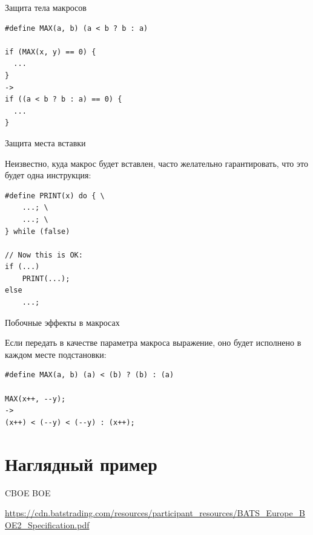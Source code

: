 \documentclass[unknownkeysallowed,xcolor=table]{beamer}
\begin{document}
\begin{frame}[fragile]{Защита тела макросов}

\begin{lstlisting}
#define MAX(a, b) (a < b ? b : a)

if (MAX(x, y) == 0) {
  ...
}
->
if ((a < b ? b : a) == 0) {
  ...
}
\end{lstlisting}

\end{frame}

\begin{frame}[fragile]{Защита места вставки}

Неизвестно, куда макрос будет вставлен, часто желательно гарантировать, что это будет одна инструкция:

\vspace{1em}

\begin{lstlisting}
#define PRINT(x) do { \
    ...; \
    ...; \
} while (false)

// Now this is OK:
if (...)
    PRINT(...);
else
    ...;
\end{lstlisting}

\end{frame}

\begin{frame}[fragile]{Побочные эффекты в макросах}

Если передать в качестве параметра макроса выражение, оно будет исполнено в каждом месте подстановки:

\vspace{1em}

\begin{lstlisting}
#define MAX(a, b) (a) < (b) ? (b) : (a)

MAX(x++, --y);
->
(x++) < (--y) < (--y) : (x++);
\end{lstlisting}

\end{frame}


\section{Наглядный пример}

\begin{frame}{CBOE BOE}

\url{https://cdn.batstrading.com/resources/participant_resources/BATS_Europe_BOE2_Specification.pdf}

\end{frame}
\end{document}

